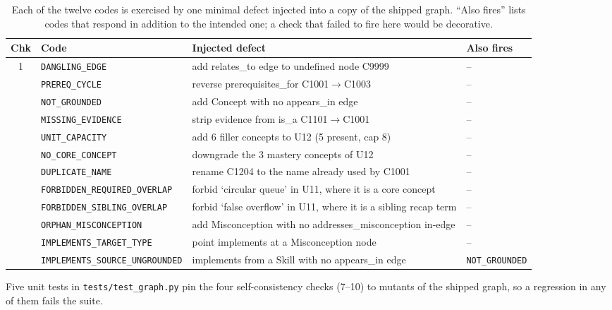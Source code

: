 \documentclass[11pt,a4paper]{article}
\newcommand{\id}[1]{\texttt{#1}}
\begin{document}
\begin{table}[htbp]
\centering
\caption{Each of the twelve codes is exercised by one minimal defect injected
into a copy of the shipped graph. ``Also fires'' lists codes that respond in
addition to the intended one; a check that failed to fire here would be
decorative.}
\label{tab:s-checks}
\footnotesize
\begin{tabularx}{\textwidth}{@{}c l L{0.38\textwidth} L{0.19\textwidth}@{}}
\toprule
Chk & Code & Injected defect & Also fires \\
 & \texttt{DANGLING\_EDGE} & add relates\_to edge to undefined node C9999 & -- \\
 & \texttt{PREREQ\_CYCLE} & reverse prerequisites\_for C1001$\to$C1003 & -- \\
 & \texttt{NOT\_GROUNDED} & add Concept with no appears\_in edge & -- \\
 & \texttt{MISSING\_EVIDENCE} & strip evidence from is\_a C1101$\to$C1001 & -- \\
 & \texttt{UNIT\_CAPACITY} & add 6 filler concepts to U12 (5 present, cap 8) & -- \\
 & \texttt{NO\_CORE\_CONCEPT} & downgrade the 3 mastery concepts of U12 & -- \\
 & \texttt{DUPLICATE\_NAME} & rename C1204 to the name already used by C1001 & -- \\
 & \texttt{FORBIDDEN\_REQUIRED\_OVERLAP} & forbid `circular queue' in U11, where it is a core concept & -- \\
 & \texttt{FORBIDDEN\_SIBLING\_OVERLAP} & forbid `false overflow' in U11, where it is a sibling recap term & -- \\
 & \texttt{ORPHAN\_MISCONCEPTION} & add Misconception with no addresses\_misconception in-edge & -- \\
 & \texttt{IMPLEMENTS\_TARGET\_TYPE} & point implements at a Misconception node & -- \\
 & \texttt{IMPLEMENTS\_SOURCE\_UNGROUNDED} & implements from a Skill with no appears\_in edge & \texttt{NOT\_GROUNDED} \\
\bottomrule
\end{tabularx}
\end{table}

Five unit tests in \id{tests/test\_graph.py} pin the four self-consistency
checks (7--10) to mutants of the shipped graph, so a regression in any of them
fails the suite.
\end{document}
